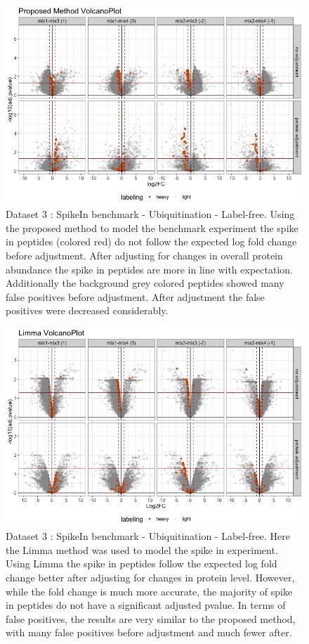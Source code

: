 \documentclass[mcp]{article}
\numberwithin{figure}{section} %
\numberwithin{table}{section}
\begin{document}
\begin{figure}[ht]
\centering
\includegraphics[width=1\textwidth]{images/spike_in_msstatsptm_volcano.png}
\caption{Dataset 3 : SpikeIn benchmark - Ubiquitination - Label-free. Using the proposed method to model the benchmark experiment the spike in peptides (colored red) do not follow the expected log fold change before adjustment. After adjusting for changes in overall protein abundance the spike in peptides are more in line with expectation. Additionally the background grey colored peptides showed many false positives before adjustment. After adjustment the false positives were decreased considerably.
}\label{fig:spikein_prop_volcano}
\end{figure}

\begin{figure}[ht]
\centering
\includegraphics[width=1\textwidth]{images/spike_in_limma_volcano.png}
\caption{Dataset 3 : SpikeIn benchmark - Ubiquitination - Label-free. Here the Limma method was used to model the spike in experiment. Using Limma the spike in peptides follow the expected log fold change better after adjusting for changes in protein level. However, while the fold change is much more accurate, the majority of spike in peptides do not have a significant adjusted pvalue. In terms of false positives, the results are very similar to the proposed method, with many false positives before adjustment and much fewer after.
}\label{fig:spikein_limma_volcano}
\end{figure}
\end{document}
